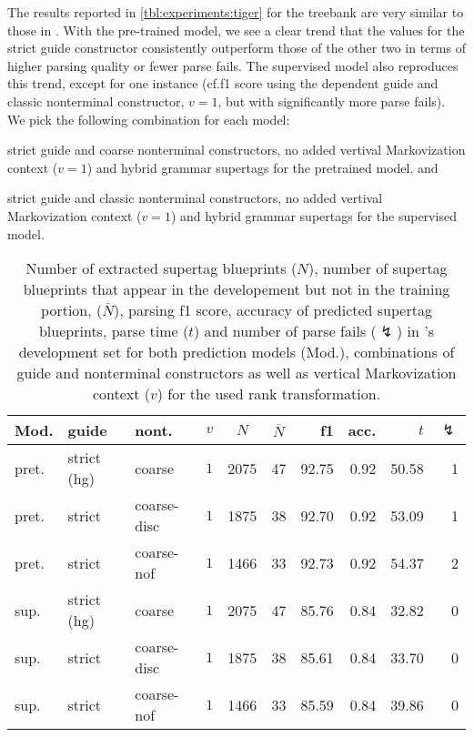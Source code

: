 \documentclass[../../document.tex]{subfiles}
\begin{document}
    The results reported in \cref{tbl:experiments:tiger} for the \tiger{} treebank are very similar to those in \negra{}.
    With the pre-trained model, we see a clear trend that the values for the strict guide constructor consistently outperform those of the other two in terms of higher parsing quality or fewer parse fails.
    The supervised model also reproduces this trend, except for one instance (cf.\@ f1 score using the dependent guide and classic nonterminal constructor, $v=1$, but with significantly more parse fails).
    We pick the following combination for each model:
    \begin{compactitem}
        \item strict guide and coarse nonterminal constructors, no added vertival Markovization context ($v=1$) and hybrid grammar supertags for the pretrained model, and
        \item strict guide and classic nonterminal constructors, no added vertival Markovization context ($v=1$) and hybrid grammar supertags for the supervised model.
    \end{compactitem}

    \begin{table}
        \caption{\label{tbl:experiments:tiger:dcp}
        Number of extracted supertag blueprints ($N$), number of supertag blueprints that appear in the developement but not in the training portion, ($\overline{N}$), parsing f1 score, accuracy of predicted  supertag blueprints, parse time ($t$) and number of parse fails ($\lightning$) in 's development set for both prediction models (Mod.), combinations of guide and nonterminal constructors as well as vertical Markovization context ($v$) for the used rank transformation.
        }
        \centering
        \setlength{\tabcolsep}{4pt}
        \vspace{.2cm}
        \begin{tabular}{lllc|cc|rrrr}
            \toprule
Mod. &  guide &   nont.   &\(v\)  & $N$ & $\overline{N}$  & f1 & acc. & $t$ & $\lightning$ \\ \hline \rowcolor{black!10}
pret. & strict (hg) &  coarse & \(1\)     & 2075 & 47 & 92.75 & 0.92 & 50.58 & 1  \\\hline
pret. & strict    &  coarse-disc & \(1\)  & 1875 & 38 & 92.70 & 0.92 & 53.09 & 1  \\
pret. & strict     &  coarse-nof & \(1\)  & 1466 & 33 & 92.73 & 0.92 & 54.37 & 2  \\
\midrule \rowcolor{black!10}
sup. & strict (hg) &  coarse & \(1\)     & 2075 & 47 & 85.76 & 0.84 & 32.82 & 0  \\\hline
sup. & strict    &  coarse-disc & \(1\)  & 1875 & 38 & 85.61 & 0.84 & 33.70 & 0  \\
sup. & strict     &  coarse-nof & \(1\)  & 1466 & 33 & 85.59 & 0.84 & 39.86 & 0  \\
    \bottomrule
        \end{tabular}
    \end{table}
\end{document}
